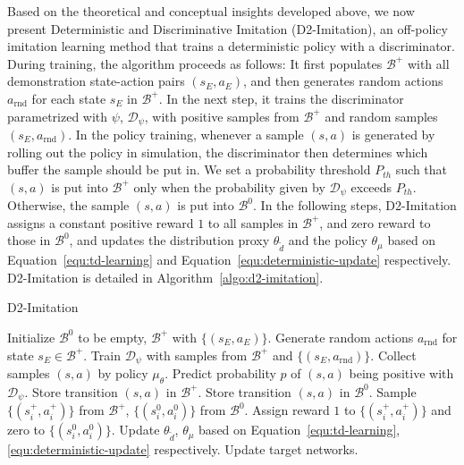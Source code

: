 \documentclass[letterpaper]{article} %
\begin{document}
Based on the theoretical and conceptual insights developed above, 
we now present Deterministic and Discriminative Imitation (D2-Imitation), 
an off-policy imitation learning method that trains a deterministic policy with a discriminator.
During training, the algorithm proceeds as follows: 
It first populates $\mathcal{B}^{+}$ with all demonstration state-action pairs $(s_E, a_E)$, 
and then generates random actions $a_{\text{rnd}}$ for each state $s_E$ in $\mathcal{B}^{+}$. 
In the next step, it trains the discriminator parametrized with $\psi$, $\mathcal{D}_{\psi}$, with positive samples from $\mathcal{B}^{+}$ and random samples $(s_E, a_{\text{rnd}})$.
In the policy training, 
whenever a sample $(s, a)$ is generated by rolling out the policy in simulation, 
the discriminator then determines which buffer the sample should be put in. 
We set a probability threshold $P_{th}$ such that $(s, a)$ is put into $\mathcal{B}^{+}$ only when the probability given by $\mathcal{D}_{\psi}$ exceeds $P_{th}$.
Otherwise, the sample $(s, a)$ is put into $\mathcal{B}^{0}$. 
In the following steps, D2-Imitation assigns a constant positive reward $1$ to all samples in $\mathcal{B}^{+}$, 
and zero reward to those in $\mathcal{B}^{0}$, 
and updates the distribution proxy $\theta_{\tilde{d}}$ and the policy $\theta_{\mu}$ based on Equation~\eqref{equ:td-learning} and Equation~\eqref{equ:deterministic-update} respectively.
D2-Imitation is detailed in Algorithm~\ref{algo:d2-imitation}. 

\begin{algorithm}[tb]
\caption{D2-Imitation}\label{algo:d2-imitation}
\begin{algorithmic}[1] %
\STATE Initialize $\mathcal{B}^{0}$ to be empty, $\mathcal{B}^{+}$ with $\{(s_{E}, a_{E}) \}$. 
\STATE Generate random actions $a_{\text{rnd}}$ for state $s_E\in\mathcal{B}^{+}$. 
\STATE Train $\mathcal{D}_{\psi}$ with samples from $\mathcal{B}^{+}$ and $\{(s_{E}, a_{\text{rnd}})\}$.
\STATE Collect samples $(s, a)$ by policy $\mu_\theta$.
\STATE Predict probability $p$ of $(s, a)$ being positive with $\mathcal{D}_{\psi}$.
\STATE Store transition $(s, a)$ in $\mathcal{B}^{+}$.
\ELSE
\STATE Store transition $(s, a)$ in $\mathcal{B}^{0}$.
\ENDIF
\STATE Sample $\{(s_i^+, a_i^+)\}$ from $\mathcal{B}^{+}$, $\{(s_i^0, a_i^0)\}$ from $\mathcal{B}^{0}$.
\STATE Assign reward $1$ to $\{(s_i^+, a_i^+) \}$ and zero to $\{(s_i^0, a_i^0) \}$.
\STATE Update $\theta_{\tilde{d}}$, $\theta_{\mu}$ based on Equation~\eqref{equ:td-learning}, \eqref{equ:deterministic-update} respectively.
\STATE Update target networks. 
\ENDIF
\ENDFOR
\end{algorithmic}
\end{algorithm}
\end{document}
